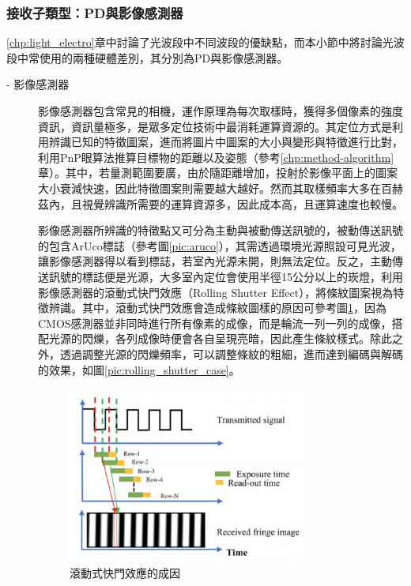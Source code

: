             \subsubsection{接收子類型：PD與影像感測器}
            \label{chp:light_receiver}

                

                \ref{chp:light_electro}章中討論了光波段中不同波段的優缺點，而本小節中將討論光波段中常使用的兩種硬體差別，其分別為PD與影像感測器。

                \begin{description}

                    \item[- 影像感測器]\hfill 
                    
                    \qquad
                    影像感測器包含常見的相機，運作原理為每次取樣時，獲得多個像素的強度資訊，資訊量極多，是眾多定位技術中最消耗運算資源的。其定位方式是利用辨識已知的特徵圖案，進而將圖片中圖案的大小與變形與特徵進行比對，利用PnP眼算法推算目標物的距離以及姿態（參考\ref{chp:method-algorithm}章）。其中，若量測範圍要廣，由於隨距離增加，投射於影像平面上的圖案大小衰減快速，因此特徵圖案則需要越大越好。然而其取樣頻率大多在百赫茲內，且視覺辨識所需要的運算資源多，因此成本高，且運算速度也較慢。

                    \qquad
                    影像感測器所辨識的特徵點又可分為主動與被動傳送訊號的，被動傳送訊號的包含ArUco標誌（參考圖\ref{pic:aruco}），其需透過環境光源照設可見光波，讓影像感測器得以看到標誌，若室內光源未開，則無法定位。反之，主動傳送訊號的標誌便是光源，大多室內定位會使用半徑15公分以上的崁燈，利用影像感測器的滾動式快門效應（Rolling Shutter Effect），將條紋圖案視為特徵辨識。其中，滾動式快門效應會造成條紋圖樣的原因可參考圖\ref{pic:rolling_shutter}，因為CMOS感測器並非同時進行所有像素的成像，而是輪流一列一列的成像，搭配光源的閃爍，各列成像時便會各自呈現亮暗，因此產生條紋樣式。除此之外，透過調整光源的閃爍頻率，可以調整條紋的粗細，進而達到編碼與解碼的效果，如圖\ref{pic:rolling_shutter_case}。

                    \begin{figure}[htpb]
                        \centering
                        \includegraphics[width=8cm]{ch2pic/rolling_shutter.png}
                        \caption{滾動式快門效應的成因\cite{pic:rolling_shutter}}
                        \label{pic:rolling_shutter}
                    \end{figure}


\end{description}
